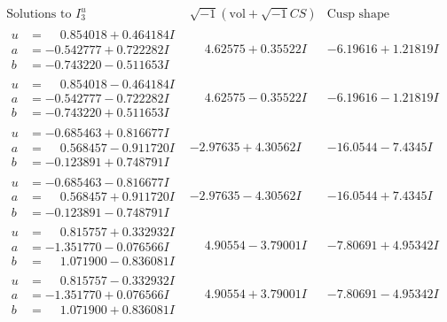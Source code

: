 \documentclass[1p]{elsarticle_modified}
\theoremstyle{definition}
\newcommand{\I}{\sqrt{-1}}
\begin{document}
$$\begin{array}{c|c|c}  
\text{Solutions to }I^u_{3}& \I (\text{vol} + \sqrt{-1}CS) & \text{Cusp shape}\\
 \hline 
\begin{aligned}
u &= \phantom{-}0.854018 + 0.464184 I \\
a &= -0.542777 + 0.722282 I \\
b &= -0.743220 - 0.511653 I\end{aligned}
 & \phantom{-}4.62575 + 0.35522 I & -6.19616 + 1.21819 I \\ \hline\begin{aligned}
u &= \phantom{-}0.854018 - 0.464184 I \\
a &= -0.542777 - 0.722282 I \\
b &= -0.743220 + 0.511653 I\end{aligned}
 & \phantom{-}4.62575 - 0.35522 I & -6.19616 - 1.21819 I \\ \hline\begin{aligned}
u &= -0.685463 + 0.816677 I \\
a &= \phantom{-}0.568457 - 0.911720 I \\
b &= -0.123891 + 0.748791 I\end{aligned}
 & -2.97635 + 4.30562 I & -16.0544 - 7.4345 I \\ \hline\begin{aligned}
u &= -0.685463 - 0.816677 I \\
a &= \phantom{-}0.568457 + 0.911720 I \\
b &= -0.123891 - 0.748791 I\end{aligned}
 & -2.97635 - 4.30562 I & -16.0544 + 7.4345 I \\ \hline\begin{aligned}
u &= \phantom{-}0.815757 + 0.332932 I \\
a &= -1.351770 - 0.076566 I \\
b &= \phantom{-}1.071900 - 0.836081 I\end{aligned}
 & \phantom{-}4.90554 - 3.79001 I & -7.80691 + 4.95342 I \\ \hline\begin{aligned}
u &= \phantom{-}0.815757 - 0.332932 I \\
a &= -1.351770 + 0.076566 I \\
b &= \phantom{-}1.071900 + 0.836081 I\end{aligned}
 & \phantom{-}4.90554 + 3.79001 I & -7.80691 - 4.95342 I \\ \hline\begin{aligned}

\end{aligned}
\end{array}$$
\end{document}
